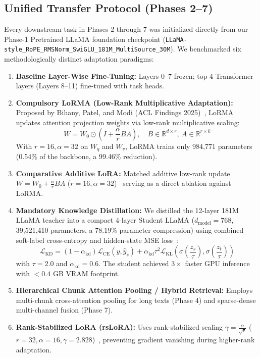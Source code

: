 \documentclass[11pt, oneside]{article}
\begin{document}
\subsection{Unified Transfer Protocol (Phases 2--7)}
Every downstream task in Phases 2 through 7 was initialized directly from our Phase-1 Pretrained LLaMA foundation checkpoint (\texttt{LLaMA-style\_RoPE\_RMSNorm\_SwiGLU\_181M\_MultiSource\_30M}). We benchmarked six methodologically distinct adaptation paradigms:
\begin{enumerate}
    \item \textbf{Baseline Layer-Wise Fine-Tuning:} Layers 0--7 frozen; top 4 Transformer layers (Layers 8--11) fine-tuned with task heads.
    \item \textbf{Compulsory LoRMA (Low-Rank Multiplicative Adaptation):} Proposed by Bihany, Patel, and Modi (ACL Findings 2025)~\cite{bihany2025lorma}, LoRMA updates attention projection weights via low-rank multiplicative scaling:
    $$W = W_0 \odot \left( I + \frac{\alpha}{r} B A \right), \quad B \in \mathbb{R}^{d \times r}, \ A \in \mathbb{R}^{r \times k}$$
    With $r=16, \alpha=32$ on $W_q$ and $W_v$, LoRMA trains only 984,771 parameters (0.54\% of the backbone, a 99.46\% reduction).
    \item \textbf{Comparative Additive LoRA:} Matched additive low-rank update $W = W_0 + \frac{\alpha}{r} B A$ ($r=16, \alpha=32$)~\cite{hu2022lora} serving as a direct ablation against LoRMA.
    \item \textbf{Mandatory Knowledge Distillation:} We distilled the 12-layer 181M LLaMA teacher into a compact 4-layer Student LLaMA ($d_{\text{model}}=768$, 39,521,410 parameters, a 78.19\% parameter compression) using combined soft-label cross-entropy and hidden-state MSE loss~\cite{hinton2015distilling}:
    $$\mathcal{L}_{\text{KD}} = (1 - \alpha_{\text{kd}}) \mathcal{L}_{\text{CE}}(y, \hat{y}_s) + \alpha_{\text{kd}} \tau^2 \mathcal{L}_{\text{KL}}\left(\sigma\left(\frac{z_s}{\tau}\right), \sigma\left(\frac{z_t}{\tau}\right)\right)$$
    with $\tau=2.0$ and $\alpha_{\text{kd}}=0.6$. The student achieved $3\times$ faster GPU inference with $<0.4$ GB VRAM footprint.
    \item \textbf{Hierarchical Chunk Attention Pooling / Hybrid Retrieval:} Employs multi-chunk cross-attention pooling for long texts (Phase 4) and sparse-dense multi-channel fusion (Phase 7).
    \item \textbf{Rank-Stabilized LoRA (rsLoRA):} Uses rank-stabilized scaling $\gamma = \frac{\alpha}{\sqrt{r}}$ ($r=32, \alpha=16, \gamma = 2.828$)~\cite{dam2023rslora}, preventing gradient vanishing during higher-rank adaptation.
\end{enumerate}
\end{document}
